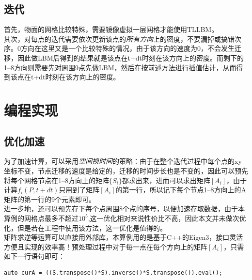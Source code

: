 \documentclass[UTF8]{ctexart}
\begin{document}
\subsection{迭代}
首先，物面的网格比较特殊，需要镜像虚拟一层网格才能使用TLLBM。\\
其次，对每点的迭代需要依次更新该点的\emph{所有方向}上的密度，不要漏掉或搞错次序。0方向在这里又是一个比较特殊的情况，由于该方向的速度为0，不会发生迁移，因此做LBM后得到的结果就是该点在t+dt时刻在该方向上的密度。而剩下的1--8方向则需要先对周围9点先做LBM，然后在按前述方法进行插值估计，从而得到该点在t+dt时刻在该方向上的密度。

\clearpage

\section{编程实现}
\subsection{优化加速}
为了加速计算，可以采用\emph{空间换时间}的策略：由于在整个迭代过程中每个点的xy坐标不变，节点迁移的速度是给定的，迁移的时间步长也是不变的，因此可以预先将每个网格节点在1--8方向上的矩阵$\{S_i\}$都求出来，进而可以求出矩阵$[A_i]$，由于计算$f_i(P,t+dt)$只用到了矩阵$[A_i]$的第一行，所以记下每个节点1--8方向上的A矩阵的第一行的9个元素即可。\\
\indent 进一步地，还可以预先存下每个点周围8个点的序号，以便加速存取数据，由于本算例的网格点最多不超过$10^5$,这一优化相对来说性价比不高，因此本文并未做次优化，但是若在工程中使用该方法，这一优化是值得的。\\
\indent 矩阵求逆等运算可以直接用外部库，本算例用的是基于C++的Eigen3，接口灵活方便且实现的效率高！预处理过程中对于每一点在每个方向上的矩阵$[A_i]$，只需如下一行语句即可：
\begin{lstlisting}
auto curA = ((S.transpose()*S).inverse()*S.transpose()).eval();
\end{lstlisting}
\end{document}
